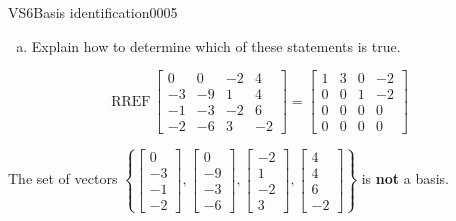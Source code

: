 \begin{exercise}{VS6}{Basis identification}{0005}
\begin{exerciseStatement}
\begin{enumerate}[(a)]
\begin{itemize}
 
\end{itemize}

     
\item  

 Explain how to determine which of these statements is true. 

 
\end{enumerate}

     \end{exerciseStatement}
 \begin{exerciseAnswer} 

 \[
\mathrm{RREF}\, \left[\begin{array}{cccc}
0 & 0 & -2 & 4 \\
-3 & -9 & 1 & 4 \\
-1 & -3 & -2 & 6 \\
-2 & -6 & 3 & -2
\end{array}\right] = \left[\begin{array}{cccc}
1 & 3 & 0 & -2 \\
0 & 0 & 1 & -2 \\
0 & 0 & 0 & 0 \\
0 & 0 & 0 & 0
\end{array}\right]
            \] 

 

 The set of vectors \(\left\{ \left[\begin{array}{c}
0 \\
-3 \\
-1 \\
-2
\end{array}\right] , \left[\begin{array}{c}
0 \\
-9 \\
-3 \\
-6
\end{array}\right] , \left[\begin{array}{c}
-2 \\
1 \\
-2 \\
3
\end{array}\right] , \left[\begin{array}{c}
4 \\
4 \\
6 \\
-2
\end{array}\right] \right\}\) is \textbf{not} a basis. 

 \end{exerciseAnswer}
 \end{exercise}


